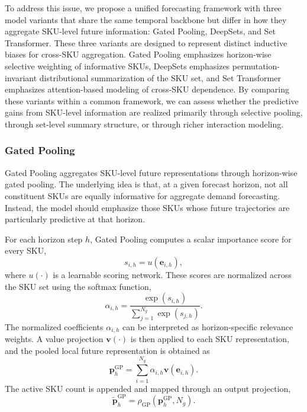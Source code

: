 \documentclass[12pt]{article}
\begin{document}
To address this issue, we propose a unified forecasting framework with three model variants that share the same temporal backbone but differ in how they aggregate SKU-level future information: Gated Pooling, DeepSets, and Set Transformer. These three variants are designed to represent distinct inductive biases for cross-SKU aggregation. Gated Pooling emphasizes horizon-wise selective weighting of informative SKUs, DeepSets emphasizes permutation-invariant distributional summarization of the SKU set, and Set Transformer emphasizes attention-based modeling of cross-SKU dependence. By comparing these variants within a common framework, we can assess whether the predictive gains from SKU-level information are realized primarily through selective pooling, through set-level summary structure, or through richer interaction modeling.

\subsubsection{Gated Pooling}
\label{subsec:tgsp}

Gated Pooling aggregates SKU-level future representations through horizon-wise gated pooling. The underlying idea is that, at a given forecast horizon, not all constituent SKUs are equally informative for aggregate demand forecasting. Instead, the model should emphasize those SKUs whose future trajectories are particularly predictive at that horizon.

For each horizon step $h$, Gated Pooling computes a scalar importance score for every SKU,
\begin{equation}
  s_{i,h}
  =
  u(\mathbf{e}_{i,h}),
\end{equation}
where $u(\cdot)$ is a learnable scoring network. These scores are normalized across the SKU set using the softmax function,
\begin{equation}
  \alpha_{i,h}
  =
  \frac{\exp(s_{i,h})}{\sum_{j=1}^{N_g}\exp(s_{j,h})}.
\end{equation}
The normalized coefficients $\alpha_{i,h}$ can be interpreted as horizon-specific relevance weights. A value projection $\mathbf{v}(\cdot)$ is then applied to each SKU representation, and the pooled local future representation is obtained as
\begin{equation}
  \mathbf{p}^{\mathrm{GP}}_h
  =
  \sum_{i=1}^{N_g}
  \alpha_{i,h}\mathbf{v}(\mathbf{e}_{i,h}).
\end{equation}
The active SKU count is appended and mapped through an output projection,
\begin{equation}
  \tilde{\mathbf{p}}^{\mathrm{GP}}_h
  =
  \rho_{\mathrm{GP}}
  \left(
  \mathbf{p}^{\mathrm{GP}}_h,
  N_g
  \right).
\end{equation}
\end{document}
